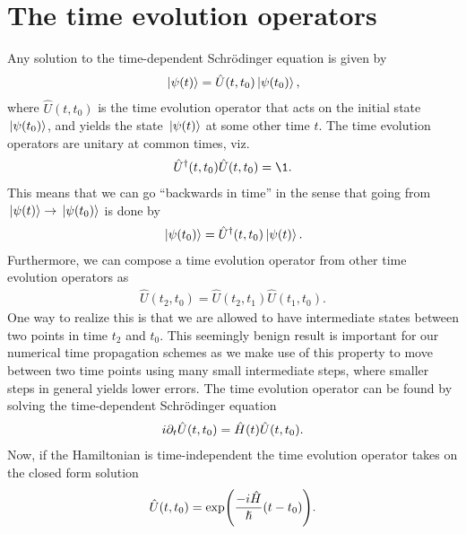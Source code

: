     \section{The time evolution operators}
        \label{sec:time-evolution-operators}
        Any solution to the time-dependent Schrödinger equation is given by
        \begin{align}
            \ket*{\psi(t)} = \hat{U}(t, t_0)\ket*{\psi(t_0)},
        \end{align}
        where $\hat{U}(t, t_0)$ is the time evolution operator that acts on the
        initial state $\ket*{\psi(t_0)}$, and yields the state $\ket*{\psi(t)}$ at
        some other time $t$.
        The time evolution operators are unitary at common times, viz.
        \begin{align}
            \hat{U}^{\dagger}(t, t_0)\hat{U}(t, t_0) = \1.
        \end{align}
        This means that we can go ``backwards in time'' in the sense that going
        from $\ket*{\psi(t)} \to \ket*{\psi(t_0)}$ is done by
        \begin{align}
            \ket*{\psi(t_0)} = \hat{U}^{\dagger}(t, t_0)\ket*{\psi(t)}.
        \end{align}
        Furthermore, we can compose a time evolution operator from other time
        evolution operators as
        \begin{align}
            \hat{U}(t_2, t_0) = \hat{U}(t_2, t_1)\hat{U}(t_1, t_0).
        \end{align}
        One way to realize this is that we are allowed to have intermediate
        states between two points in time $t_2$ and $t_0$.
        This seemingly benign result is important for our numerical time
        propagation schemes as we make use of this property to move between
        two time points using many small intermediate steps, where smaller steps
        in general yields lower errors.
        The time evolution operator can be found by solving the time-dependent
        Schrödinger equation
        \begin{gather}
            i\partial_t\hat{U}(t, t_0) = \hat{H}(t)\hat{U}(t, t_0).
        \end{gather}
        Now, if the Hamiltonian is time-independent the time evolution operator
        takes on the closed form solution
        \begin{align}
            \hat{U}(t, t_0) = \exp(
                \frac{-i \hat{H}}{\hslash} (t - t_0)
            ).
            \label{eq:ti-evolution}
        \end{align}
